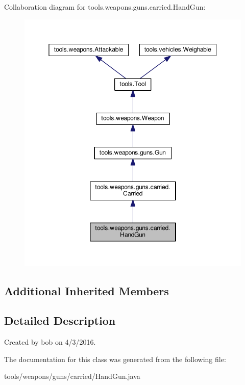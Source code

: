 Collaboration diagram for tools.\+weapons.\+guns.\+carried.\+Hand\+Gun\+:
\nopagebreak
\begin{figure}[H]
\begin{center}
\leavevmode
\includegraphics[width=350pt]{classtools_1_1weapons_1_1guns_1_1carried_1_1_hand_gun__coll__graph}
\end{center}
\end{figure}
\subsection*{Additional Inherited Members}


\subsection{Detailed Description}
Created by bob on 4/3/2016. 

The documentation for this class was generated from the following file\+:\begin{DoxyCompactItemize}
\item 
tools/weapons/guns/carried/Hand\+Gun.\+java\end{DoxyCompactItemize}
